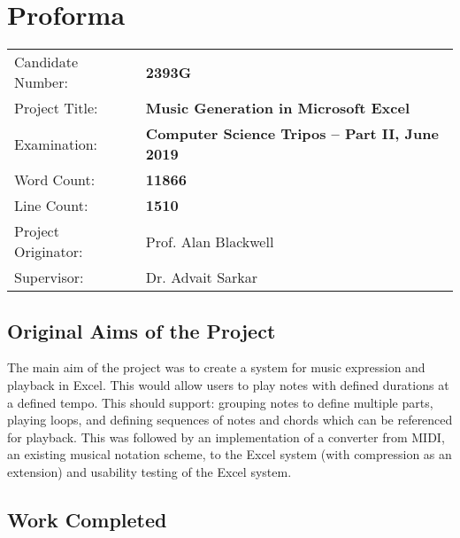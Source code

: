 \newpage

\chapter*{Proforma}

{\large
\begin{tabular}{ll}
Candidate Number:   & \bf 2393G                                \\
Project Title:      & \bf Music Generation in Microsoft Excel \\
Examination:        & \bf Computer Science Tripos -- Part II, June 2019  \\
Word Count:         & \bf 11866\footnotemark[1]  \\
Line Count:         & \bf 1510\footnotemark[2]  \\
Project Originator: & Prof. Alan Blackwell                    \\
Supervisor:         & Dr. Advait Sarkar                    \\
\end{tabular}
}


\section*{Original Aims of the Project}

The main aim of the project was to create a system for music expression and playback in Excel. This would allow users to play notes with defined durations at a defined tempo. This should support: grouping notes to define multiple parts, playing loops, and defining sequences of notes and chords which can be referenced for playback. This was followed by an implementation of a converter from MIDI, an existing musical notation scheme, to the Excel system (with compression as an extension) and usability testing of the Excel system.

\section*{Work Completed}

